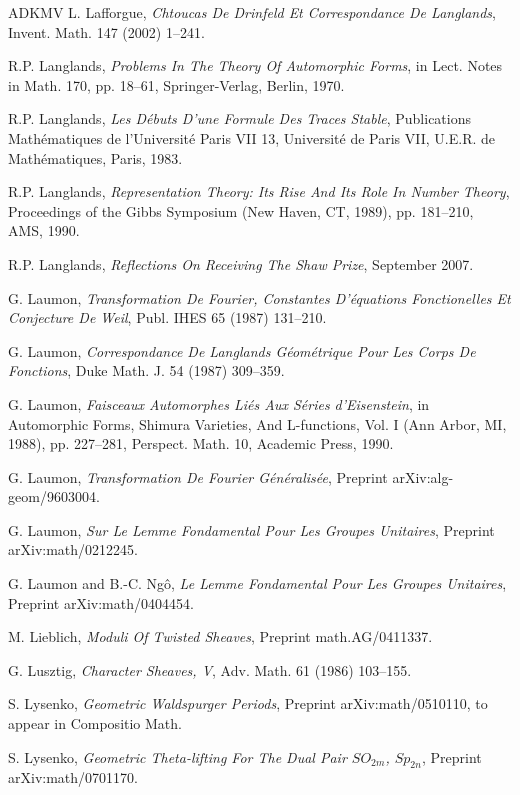 \documentclass[11pt,a4paper]{article}
\begin{document}
\begin{thebibliography}{ADKMV}
 L. Lafforgue, \emph{Chtoucas De Drinfeld Et Correspondance De Langlands}, Invent. Math. 147 (2002) 1--241.

 R.P. Langlands, \emph{Problems In The Theory Of Automorphic Forms}, in Lect. Notes in Math. 170, pp. 18--61, Springer-Verlag, Berlin, 1970.

 R.P. Langlands, \emph{Les D\'ebuts D'une Formule Des Traces Stable}, Publications Math\'ematiques de l'Universit\'e Paris VII 13, Universit\'e de Paris VII, U.E.R. de Math\'ematiques, Paris, 1983.

 R.P. Langlands, \emph{Representation Theory: Its Rise And Its Role In Number Theory}, Proceedings of the Gibbs Symposium (New Haven, CT, 1989), pp. 181--210, AMS, 1990.

 R.P. Langlands, \emph{Reflections On Receiving The Shaw Prize}, September 2007.

 G. Laumon, \emph{Transformation De Fourier, Constantes D'\'equations Fonctionelles Et Conjecture De Weil}, Publ. IHES 65 (1987) 131--210.

 G. Laumon, \emph{Correspondance De Langlands G\'eom\'etrique Pour Les Corps De Fonctions}, Duke Math. J. 54 (1987) 309--359.

 G. Laumon, \emph{Faisceaux Automorphes Li\'es Aux S\'eries d'Eisenstein}, in Automorphic Forms, Shimura Varieties, And L-functions, Vol. I (Ann Arbor, MI, 1988), pp. 227--281, Perspect. Math. 10, Academic Press, 1990.

 G. Laumon, \emph{Transformation De Fourier G\'en\'eralis\'ee}, Preprint arXiv:alg-geom/9603004.

 G. Laumon, \emph{Sur Le Lemme Fondamental Pour Les Groupes Unitaires}, Preprint arXiv:math/0212245.

 G. Laumon and B.-C. Ng\^o, \emph{Le Lemme Fondamental Pour Les Groupes Unitaires}, Preprint arXiv:math/0404454.

 M. Lieblich, \emph{Moduli Of Twisted Sheaves}, Preprint math.AG/0411337.

 G. Lusztig, \emph{Character Sheaves, V}, Adv. Math. 61 (1986) 103--155.

 S. Lysenko, \emph{Geometric Waldspurger Periods}, Preprint arXiv:math/0510110, to appear in Compositio Math.

 S. Lysenko, \emph{Geometric Theta-lifting For The Dual Pair $SO_{2m}$, $Sp_{2n}$}, Preprint arXiv:math/0701170.


\end{thebibliography}
\end{document}
